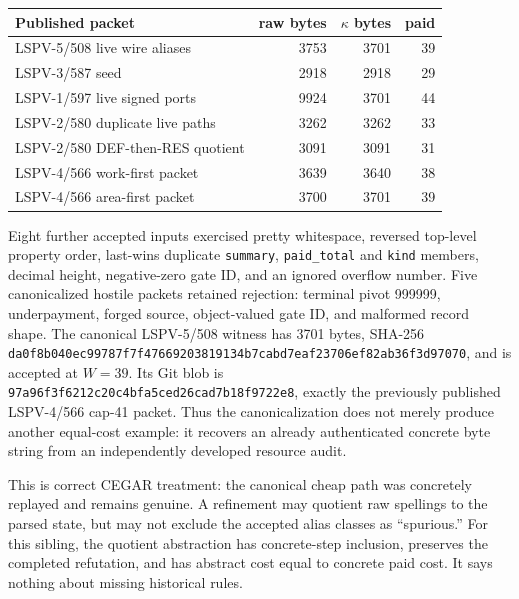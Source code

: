 \documentclass[11pt]{article}
\begin{document}
\begin{center}
\begin{tabular}{@{}lrrr@{}}
\toprule
Published packet & raw bytes & $\kappa$ bytes & paid \\
\midrule
LSPV-5/508 live wire aliases & 3753 & 3701 & 39 \\
LSPV-3/587 seed & 2918 & 2918 & 29 \\
LSPV-1/597 live signed ports & 9924 & 3701 & 44 \\
LSPV-2/580 duplicate live paths & 3262 & 3262 & 33 \\
LSPV-2/580 DEF-then-RES quotient & 3091 & 3091 & 31 \\
LSPV-4/566 work-first packet & 3639 & 3640 & 38 \\
LSPV-4/566 area-first packet & 3700 & 3701 & 39 \\
\bottomrule
\end{tabular}
\end{center}

Eight further accepted inputs exercised pretty whitespace, reversed top-level
property order, last-wins duplicate \texttt{summary}, \texttt{paid\_total}
and \texttt{kind} members, decimal height, negative-zero gate ID, and an
ignored overflow number.  Five canonicalized hostile packets retained
rejection: terminal pivot 999999, underpayment, forged source, object-valued
gate ID, and malformed record shape.  The canonical LSPV-5/508 witness has
3701 bytes, SHA-256
\texttt{da0f8b040ec99787f7f47669203819134b7cabd7eaf23706ef82ab36f3d97070},
and is accepted at $W=39$.
Its Git blob is
\texttt{97a96f3f6212c20c4bfa5ced26cad7b18f9722e8}, exactly the previously
published LSPV-4/566 cap-41 packet.  Thus the canonicalization does not merely
produce another equal-cost example: it recovers an already authenticated
concrete byte string from an independently developed resource audit.

This is correct CEGAR treatment: the canonical cheap path was concretely
replayed and remains genuine.  A refinement may quotient raw spellings to the
parsed state, but may not exclude the accepted alias classes as ``spurious.''
For this sibling, the quotient abstraction has concrete-step inclusion,
preserves the completed refutation, and has abstract cost equal to concrete
paid cost.  It says nothing about missing historical rules.
\end{document}
